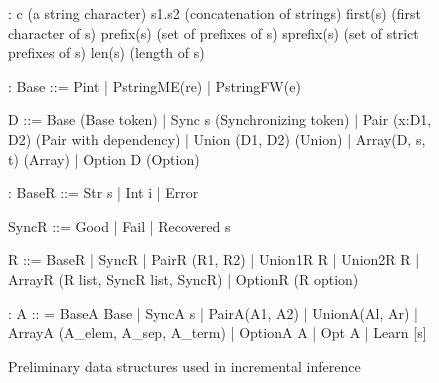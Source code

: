 \begin{figure}[t]
{\small 
\begin{code}
:
c            (a string character)	
s1.s2        (concatenation of strings)
first(s)     (first character of s)
prefix(s)    (set of prefixes of s) 
sprefix(s)   (set of strict prefixes of s)
len(s)       (length of s)
\end{code}
\begin{code}
:
Base ::= Pint | PstringME(re) | PstringFW(e)
\end{code}
\begin{code}
D ::=   
  Base               (Base token)
| Sync s             (Synchronizing token) 
| Pair (x:D1, D2)    (Pair with dependency)
| Union (D1, D2)     (Union)
| Array(D, s, t)     (Array)
| Option D           (Option)
\end{code}
\begin{code}
:
BaseR ::= Str s | Int i | Error
\end{code}
\begin{code}
SyncR ::= Good | Fail | Recovered s 
\end{code}
\begin{code}
R ::=
  BaseR
| SyncR
| PairR (R1, R2)
| Union1R R | Union2R R 
| ArrayR (R list, SyncR list, SyncR)
| OptionR (R option)
\end{code}
\begin{code}
:
A :: = 
  BaseA Base
| SyncA s
| PairA(A1, A2)
| UnionA(Al, Ar)
| ArrayA (A_elem, A_sep, A_term)
| OptionA A
| Opt A
| Learn [s]
\end{code}
}
\caption{Preliminary data structures used in incremental inference}
\label{fig:data-structures}
\end{figure}


